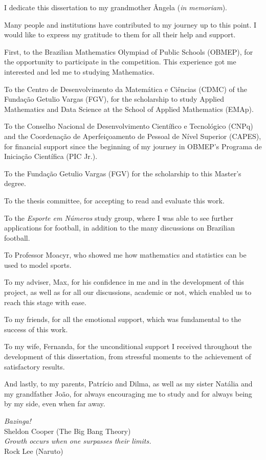 \begin{dedicatoria}
    \vspace*{\fill}
    \hfill
    \begin{minipage}{.6\textwidth}
        I dedicate this dissertation to my grandmother Ângela (\textit{in memoriam}).
    \end{minipage}
\end{dedicatoria}
 
\begin{agradecimentos}
    Many people and institutions have contributed to my journey up to this point.
    I would like to express my gratitude to them for all their help and support.

    First, to the Brazilian Mathematics Olympiad of Public Schools (OBMEP), for the opportunity to participate in the competition.
    This experience got me interested and led me to studying Mathematics.

    To the Centro de Desenvolvimento da Matemática e Ciências (CDMC) of the Fundação Getulio Vargas (FGV), for the scholarship to study Applied Mathematics and Data Science at the School of Applied Mathematics (EMAp).
    
    To the Conselho Nacional de Desenvolvimento Científico e Tecnológico (CNPq) and the Coordenação de Aperfeiçoamento de Pessoal de Nível Superior (CAPES), for financial support since the beginning of my journey in OBMEP's Programa de Iniciação Científica (PIC Jr.).

    To the Fundação Getulio Vargas (FGV) for the scholarship to this Master's degree.

    To the thesis committee, for accepting to read and evaluate this work.

    To the \textit{Esporte em Números} study group, where I was able to see further applications for football, in addition to the many discussions on Brazilian football.

    To Professor Moacyr, who showed me how mathematics and statistics can be used to model sports.

    To my adviser, Max, for his confidence in me and in the development of this project, as well as for all our discussions, academic or not, which enabled us to reach this stage with ease.

    To my friends, for all the emotional support, which was fundamental to the success of this work.
    
    To my wife, Fernanda, for the unconditional support I received throughout the development of this dissertation, from stressful moments to the achievement of satisfactory results.

    And lastly, to my parents, Patrício and Dilma, as well as my sister Natália and my grandfather João, for always encouraging me to study and for always being by my side, even when far away.
\end{agradecimentos}

\begin{epigrafe}
    \vspace*{\fill}
    \begin{flushright}
        \hspace{7.5cm}
        \textit{Bazinga!} \\
        Sheldon Cooper (The Big Bang Theory) \\
        \textit{Growth occurs when one surpasses their limits.} \\
        Rock Lee (Naruto)
    \end{flushright}
\end{epigrafe}
